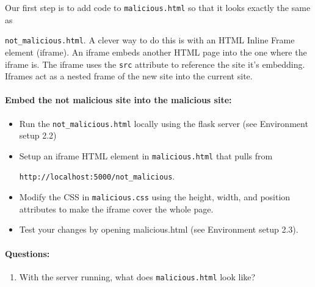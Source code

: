 Our first step is to add code to \texttt{malicious.html} so that it looks exactly the same as 

\noindent\texttt{not\_malicious.html}. A clever way to do this is with an HTML Inline Frame element (iframe). An iframe embeds another HTML page into the one where the iframe is. The iframe uses the \texttt{src} attribute to reference the site it's embedding. Iframes act as a nested frame of the new site into the current site. 

\paragraph{Embed the not malicious site into the malicious site:}
\begin{itemize}
    \item Run the \texttt{not\_malicious.html} locally using the flask server (see Environment setup 2.2)
    \item Setup an iframe HTML element in \texttt{malicious.html} that pulls from
    
    \texttt{http://localhost:5000/not\_malicious}. 
    
    \item Modify the CSS in \texttt{malicious.css} using the height, width, and position attributes to make the iframe cover the whole page.
    
    \item Test your changes by opening malicious.html (see Environment setup 2.3).
\end{itemize} 



\paragraph{Questions:}
\begin{enumerate}
    \item With the server running, what does \texttt{malicious.html} look like?
\end{enumerate}

